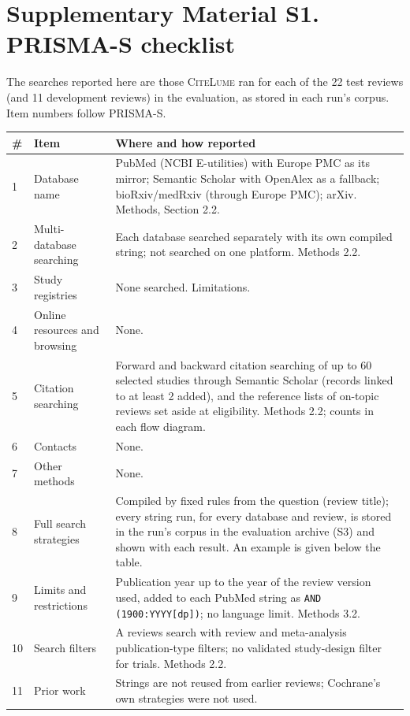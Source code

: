 \documentclass[11pt]{article}
\begin{document}
\section*{Supplementary Material S1. PRISMA-S checklist}

The searches reported here are those \textsc{CiteLume} ran for each of the 22 test reviews (and 11 development
reviews) in the evaluation, as stored in each run's corpus. Item numbers follow PRISMA-S.

\small
\begin{tabularx}{\linewidth}{@{}p{0.5cm}p{3.6cm}X@{}}
\toprule
\# & Item & Where and how reported \\
\midrule
1 & Database name & PubMed (NCBI E-utilities) with Europe PMC as its mirror; Semantic Scholar with OpenAlex as a
fallback; bioRxiv/medRxiv (through Europe PMC); arXiv. Methods, Section 2.2. \\
2 & Multi-database searching & Each database searched separately with its own compiled string; not searched on one
platform. Methods 2.2. \\
3 & Study registries & None searched. Limitations. \\
4 & Online resources and browsing & None. \\
5 & Citation searching & Forward and backward citation searching of up to 60 selected studies through Semantic
Scholar (records linked to at least 2 added), and the reference lists of on-topic reviews set aside at eligibility.
Methods 2.2; counts in each flow diagram. \\
6 & Contacts & None. \\
7 & Other methods & None. \\
8 & Full search strategies & Compiled by fixed rules from the question (review title); every string run, for every
database and review, is stored in the run's corpus in the evaluation archive (S3) and shown with each result. An
example is given below the table. \\
9 & Limits and restrictions & Publication year up to the year of the review version used, added to each PubMed
string as \texttt{AND (1900:YYYY[dp])}; no language limit. Methods 3.2. \\
10 & Search filters & A reviews search with review and meta-analysis publication-type filters; no validated
study-design filter for trials. Methods 2.2. \\
11 & Prior work & Strings are not reused from earlier reviews; Cochrane's own strategies were not used. \\

\end{tabularx}
\end{document}
